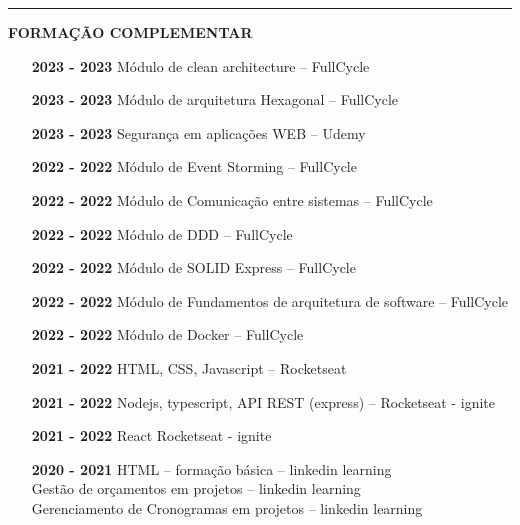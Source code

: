 \documentclass[12pt, a4paper]{article}
\newcommand{\LlinhaG}{2pt} %
\newcommand{\TlinhaG}{17cm}  %
\begin{document}
\begin{center}	%
	\rule{\TlinhaG}{\LlinhaG}
\end{center}

\begin{center}
	\textbf{FORMAÇÃO COMPLEMENTAR}\\
\end{center}
\begin{itemize}
	\item[\textbf{2023 - 2023}] Módulo de clean architecture – FullCycle\\
	\item[\textbf{2023 - 2023}] Módulo de arquitetura Hexagonal – FullCycle\\
	\item[\textbf{2023 - 2023}] Segurança em aplicações WEB – Udemy\\
	\item[\textbf{2022 - 2022}] Módulo de Event Storming – FullCycle\\
	\item[\textbf{2022 - 2022}] Módulo de Comunicação entre sistemas – FullCycle\\
	\item[\textbf{2022 - 2022}] Módulo de DDD – FullCycle\\
	\item[\textbf{2022 - 2022}] Módulo de SOLID Express – FullCycle\\
	\item[\textbf{2022 - 2022}] Módulo de Fundamentos de arquitetura de software – FullCycle\\
	\item[\textbf{2022 - 2022}] Módulo de Docker – FullCycle\\
	\item[\textbf{2021 - 2022}] HTML, CSS, Javascript – Rocketseat\\
	\item[\textbf{2021 - 2022}] Nodejs, typescript, API REST (express) – Rocketseat - ignite\\
	\item[\textbf{2021 - 2022}] React Rocketseat - ignite\\
	\item[\textbf{2020 - 2021}] HTML – formação básica – linkedin learning\\
		Gestão de orçamentos em projetos – linkedin learning\\
		Gerenciamento de Cronogramas em projetos – linkedin learning\\

\end{itemize}
\end{document}
